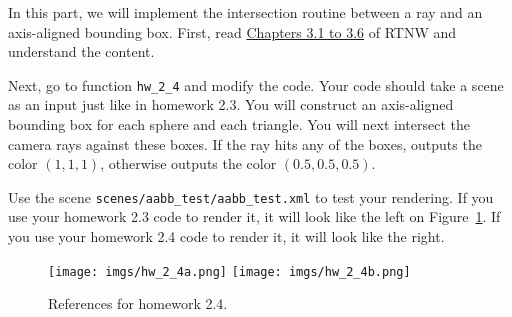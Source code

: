 In this part, we will implement the intersection routine between a ray and an axis-aligned bounding box. First, read \href{https://raytracing.github.io/books/RayTracingTheNextWeek.html#boundingvolumehierarchies}{Chapters 3.1 to 3.6} of RTNW and understand the content.

Next, go to function \lstinline{hw_2_4} and modify the code. Your code should take a scene as an input just like in homework 2.3. You will construct an axis-aligned bounding box for each sphere and each triangle. You will next intersect the camera rays against these boxes. If the ray hits any of the boxes, outputs the color $(1, 1, 1)$, otherwise outputs the color $(0.5, 0.5, 0.5)$.

Use the scene \lstinline{scenes/aabb_test/aabb_test.xml} to test your rendering. If you use your homework 2.3 code to render it, it will look like the left on Figure~\ref{fig:hw_2_4}. If you use your homework 2.4 code to render it, it will look like the right.

\begin{figure}[ht]
    \centering
    \texttt{[image: imgs/hw\_2\_4a.png]}
    \texttt{[image: imgs/hw\_2\_4b.png]}
    \caption{References for homework 2.4.}
    \label{fig:hw_2_4}
\end{figure}


%
%


